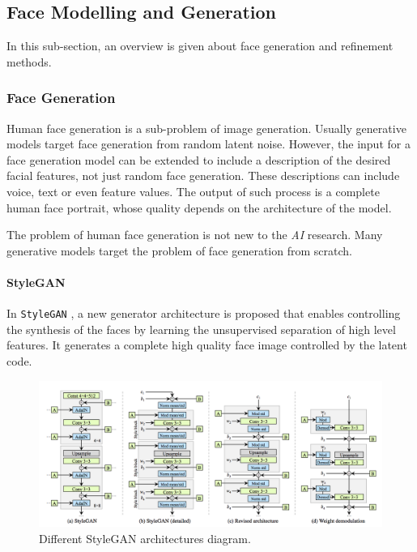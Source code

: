 \subsection{Face Modelling and Generation}
In this sub-section, an overview is given about face generation and refinement methods.

\subsubsection{Face Generation}
Human face generation is a sub-problem of image generation. Usually generative models target face generation from random latent noise. However, the input for a face generation model can be extended to include a description of the desired facial features, not just random face generation. These descriptions can include voice, text or even feature values. The output of such process is a complete human face portrait, whose quality depends on the architecture of the model.

The problem of human face generation is not new to the \emph{AI} research. Many generative models target the problem of face generation from scratch.

\paragraph{StyleGAN}
In \texttt{StyleGAN} \cite{karras2019stylebased}, a new generator architecture is proposed that enables controlling the synthesis of the faces by learning the unsupervised separation of high level features. It generates a complete high quality face image controlled by the latent code.

\begin{figure}[H]
    \centering
    \includegraphics[width=\textwidth]{images/stylegan-arch.png}
    \caption{Different StyleGAN architectures diagram.}
    \label{fig:stylegan_arch}
\end{figure}

